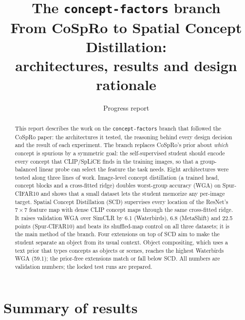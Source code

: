 \documentclass[11pt]{article}
\title{\textbf{The \texttt{concept-factors} branch}\\[3pt]
\large From CoSpRo to Spatial Concept Distillation:\\ architectures, results and design rationale}
\author{Progress report}
\date{}
\begin{document}
\maketitle
\vspace{-1.5em}

\begin{abstract}
\noindent This report describes the work on the \texttt{concept-factors} branch that followed the CoSpRo
paper: the architectures it tested, the reasoning behind every design decision and the result of each
experiment. The branch replaces CoSpRo's prior about \emph{which} concept is spurious by a symmetric goal:
the self-supervised student should encode every concept that CLIP/SpLiCE finds in the training images, so
that a group-balanced linear probe can select the feature the task needs. Eight architectures were tested
along three lines of work. Image-level concept distillation (a trained head, concept blocks and a
cross-fitted ridge) doubles worst-group accuracy (WGA) on Spur-CIFAR10 and shows that a small dataset lets
the student memorize any per-image target. Spatial Concept Distillation (SCD) supervises every location of
the ResNet's $7\times7$ feature map with dense CLIP concept maps through the same cross-fitted ridge. It raises
validation WGA over SimCLR by 6.1 (Waterbirds), 6.8 (MetaShift) and 22.5 points (Spur-CIFAR10) and beats its
shuffled-map control on all three datasets; it is the main method of the branch. Four extensions on top of
SCD aim to make the student separate an object from its usual context. Object compositing, which uses a text
prior that types concepts as objects or scenes, reaches the highest Waterbirds WGA (59.1); the prior-free
extensions match or fall below SCD. All numbers are validation numbers; the locked test runs are prepared.
\end{abstract}

\tableofcontents
\newpage

\section{Summary of results}
\end{document}
